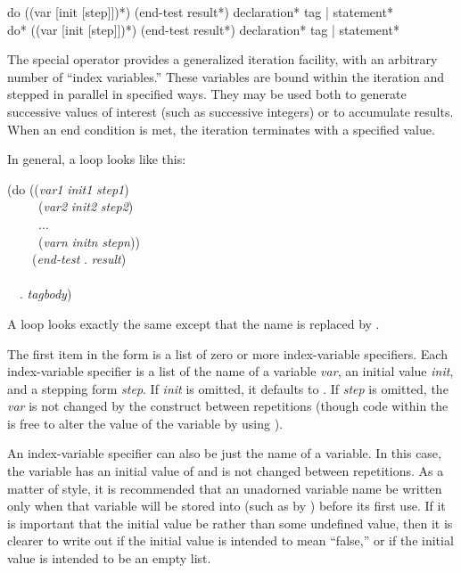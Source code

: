 \begin{defmac}
do ({(var [init [step]])}*)
   (end-test {result}*)
   {declaration}* {tag | statement}* \\
do* ({(var [init [step]])}*)
    (end-test {result}*)
    {declaration}* {tag | statement}*

The  special operator provides a generalized iteration facility,
with an arbitrary number of ``index variables.''
These variables are bound within the iteration and stepped in parallel
in specified ways.  They may be used both to generate successive
values of interest (such as successive integers) or to accumulate results.
When an end condition is met, the iteration terminates with a specified value.

In general, a  loop looks like this:
\begin{lisp}
(do ((\emph{var1} \emph{init1} \emph{step1}) \\
~~~~~(\emph{var2} \emph{init2} \emph{step2}) \\
~~~~~... \\
~~~~~(\emph{varn} \emph{initn} \emph{stepn})) \\
~~~~(\emph{end-test} . \emph{result}) \\
~~ \\
~~. \emph{tagbody})
\end{lisp}
A  loop looks exactly the same except that the name  is
replaced by .

The first item in the form is a list of zero or more index-variable
specifiers.  Each index-variable specifier is a list of the name of a
variable \emph{var}, an initial value \emph{init},
and a stepping form \emph{step}.
If \emph{init} is omitted, it defaults to {\false}.
If \emph{step} is omitted, the \emph{var} is not changed by the  construct
between repetitions (though code within the  is free to alter
the value of the variable by using ).

An index-variable specifier can also be just the name of a variable.
In this case, the variable has an initial value of {\false} and is
not changed between repetitions.
As a matter
of style, it is recommended that an unadorned variable name
be written only when that
variable will be stored into (such as by ) before its first
use.  If it is important that the initial value be {\false} rather than
some undefined value, then it is clearer to write out
 if the initial value is intended to mean ``false,'' or
 if the initial value is intended to be an empty
list.


\end{defmac}

